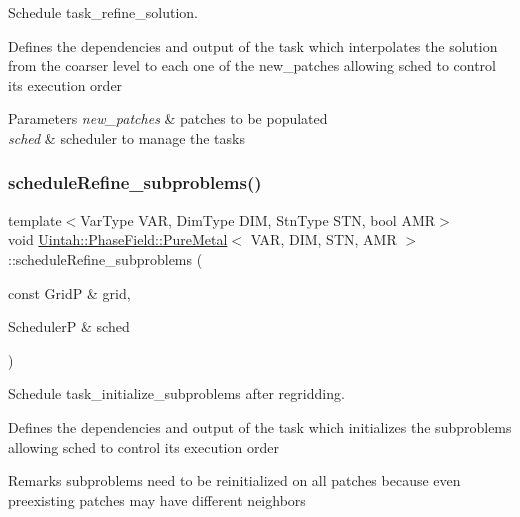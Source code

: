 Schedule task\+\_\+refine\+\_\+solution. 

Defines the dependencies and output of the task which interpolates the solution from the coarser level to each one of the new\+\_\+patches allowing sched to control its execution order


\begin{DoxyParams}{Parameters}
{\em new\+\_\+patches} & patches to be populated \\
\hline
{\em sched} & scheduler to manage the tasks \\
\hline
\end{DoxyParams}
\mbox{\label{classUintah_1_1PhaseField_1_1PureMetal_ae742f1e0b6f940c346d21bee750bd206}} 
\subsubsection{\texorpdfstring{schedule\+Refine\+\_\+subproblems()}{scheduleRefine\_subproblems()}}
{\footnotesize\ttfamily template$<$Var\+Type V\+AR, Dim\+Type D\+IM, Stn\+Type S\+TN, bool A\+MR$>$ \\
void \hyperlink{classUintah_1_1PhaseField_1_1PureMetal}{Uintah\+::\+Phase\+Field\+::\+Pure\+Metal}$<$ V\+AR, D\+IM, S\+TN, A\+MR $>$\+::schedule\+Refine\+\_\+subproblems (\begin{DoxyParamCaption}\item[{const GridP \&}]{grid,  }\item[{SchedulerP \&}]{sched }\end{DoxyParamCaption})\hspace{0.3cm}{\ttfamily [protected]}}



Schedule task\+\_\+initialize\+\_\+subproblems after regridding. 

Defines the dependencies and output of the task which initializes the subproblems allowing sched to control its execution order

\begin{DoxyRemark}{Remarks}
subproblems need to be reinitialized on all patches because even preexisting patches may have different neighbors
\end{DoxyRemark}

